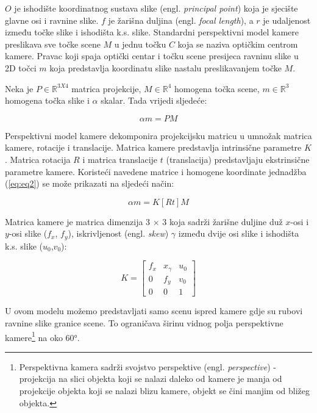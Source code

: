 \documentclass[../seminar.tex]{subfiles}
\begin{document}
$O$ je ishodište koordinatnog sustava slike (engl. \textit{principal point}) koja je sjecište glavne osi i ravnine slike. 
$f$ je žarišna duljina (engl. \textit{focal length}), a $r$ je udaljenost između točke slike i ishodišta k.s. slike. 
Standardni perspektivni model kamere preslikava sve točke scene $M$ u jednu točku $C$ koja se naziva optičkim centrom kamere.
Pravac koji spaja optički centar i točku scene presijeca ravninu slike u 2D točci $m$ koja predstavlja koordinatu slike nastalu preslikavanjem točke $M$. 

Neka je $P \in \mathbb{R}^{3X4}$ matrica projekcije, $M \in \mathbb{R}^4$ homogena točka scene, $m \in \mathbb{R}^3$ homogena točka slike i $\alpha$ skalar.
Tada vrijedi sljedeće:

\begin{equation}
\label{eq:eq2}
\alpha m = PM
\end{equation}

Perspektivni model kamere dekomponira projekcijsku matricu u umnožak matrica kamere, rotacije i translacije.
Matrica kamere predstavlja intrinsične parametre \textbf{$K$}.
Matrica rotacija \textbf{$R$} i matrica translacije \textbf{$t$} (translacija) predstavljaju ekstrinsične parametre kamere.
Koristeći navedene matrice i homogene koordinate jednadžba (\ref{eq:eq2}) se može prikazati na sljedeći način:

\begin{equation}
\alpha m = K[R t]M
\end{equation}

Matrica kamere je matrica dimenzija 3 $\times$ 3 koja sadrži žarišne duljine duž $x$-osi i $y$-osi slike ($f_x$, $f_y$), iskrivljenost (engl. \textit{skew}) $\gamma$ između dvije osi slike i ishodišta k.s. slike ($u_0$,$v_0$):

\begin{equation}
K = \begin{bmatrix}
    f_x     & x_{\gamma}& u_0 \\
    0       & f_y       & v_0 \\
    0       & 0         & 1
\end{bmatrix}
\end{equation}

U ovom modelu možemo predstavljati samo scenu ispred kamere gdje su rubovi ravnine slike granice scene. To ograničava širinu vidnog polja perspektivne kamere\footnote{Perspektivna kamera sadrži svojstvo perspektive (engl. \textit{perspective}) - projekcija na slici objekta koji se nalazi daleko od kamere je manja od projekcije objekta koji se nalazi blizu kamere, objekt se čini manjim od bližeg objekta.} na oko 60°.\cite{Kashyap}
\end{document}
